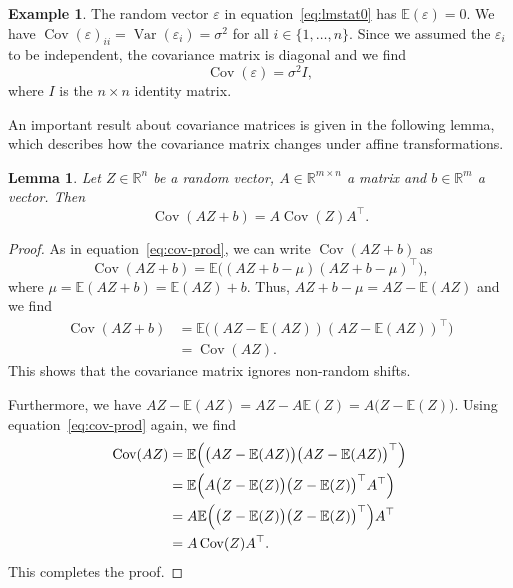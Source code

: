 \documentclass[
  a4paper,
]{article}
\newtheorem{lemma}{Lemma}[section]
\theoremstyle{definition}
\theoremstyle{definition}
\newtheorem{example}{Example}[section]
\theoremstyle{definition}
\theoremstyle{definition}
\theoremstyle{remark}
\begin{document}
\begin{example}
The random vector \(\varepsilon\) in equation~\eqref{eq:lmstat0} has \(\mathbb{E}(\varepsilon) = 0\).
We have
\(\mathop{\mathrm{Cov}}(\varepsilon)_{ii} = \mathop{\mathrm{Var}}(\varepsilon_i) = \sigma^2\) for all \(i\in\{1, \ldots, n\}\).
Since we assumed the \(\varepsilon_i\) to be independent, the covariance matrix is
diagonal and we find
\begin{equation*}
  \mathop{\mathrm{Cov}}(\varepsilon) = \sigma^2 I,
\end{equation*}
where \(I\) is the \(n\times n\) identity matrix.
\end{example}

An important result about covariance matrices is given in the following
lemma, which describes how the covariance matrix changes under affine
transformations.

\begin{lemma}
\protect\hypertarget{lem:Cov-is-quadratic}{}\label{lem:Cov-is-quadratic}Let \(Z\in\mathbb{R}^n\) be a random vector, \(A\in\mathbb{R}^{m\times n}\) a matrix
and \(b\in\mathbb{R}^m\) a vector. Then
\begin{equation*}
  \mathop{\mathrm{Cov}}(AZ+b)
  = A \mathop{\mathrm{Cov}}(Z) A^\top.
\end{equation*}
\end{lemma}

\begin{proof}
As in equation~\eqref{eq:cov-prod}, we can write \(\mathop{\mathrm{Cov}}(AZ+b)\)
as
\begin{equation*}
  \mathop{\mathrm{Cov}}(AZ+b)
  = \mathbb{E}\bigl( (AZ + b - \mu) (AZ + b - \mu)^\top \bigr),
\end{equation*}
where \(\mu = \mathbb{E}(AZ + b) = \mathbb{E}(AZ) + b\). Thus,
\(AZ + b - \mu = AZ - \mathbb{E}(AZ)\) and we find
\begin{align*}
  \mathop{\mathrm{Cov}}(AZ+b)
  &= \mathbb{E}\bigl( (AZ - \mathbb{E}(AZ)) (AZ - \mathbb{E}(AZ))^\top \bigr) \\
  &= \mathop{\mathrm{Cov}}(AZ).
\end{align*}
This shows that the covariance matrix ignores non-random shifts.

Furthermore, we have \(AZ - \mathbb{E}(AZ) = AZ - A\mathbb{E}(Z) = A\bigl(Z - \mathbb{E}(Z)\bigr)\).
Using equation~\eqref{eq:cov-prod} again, we find
\begin{align*}
  \mathop{\mathrm{Cov}}(AZ)
  &= \mathbb{E}\Bigl( \bigl(AZ - \mathbb{E}(AZ)\bigr) \bigl(AZ - \mathbb{E}(AZ)\bigr)^\top \Bigr) \\
  &= \mathbb{E}\Bigl( A \bigl(Z - \mathbb{E}(Z)\bigr) \bigl(Z - \mathbb{E}(Z)\bigr)^\top A^\top \Bigr) \\
  &= A \mathbb{E}\Bigl( \bigl(Z - \mathbb{E}(Z)\bigr) \bigl(Z - \mathbb{E}(Z)\bigr)^\top \Bigr) A^\top \\
  &= A \mathop{\mathrm{Cov}}(Z) A^\top.
\end{align*}
This completes the proof.
\end{proof}
\end{document}
